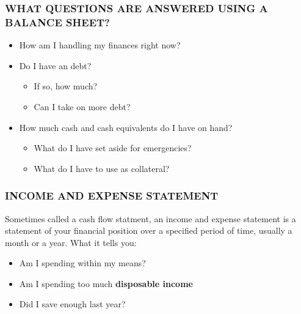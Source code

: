 \documentclass[12pt]{article}
\begin{document}
            \subsubsection{WHAT QUESTIONS ARE ANSWERED USING A BALANCE SHEET?}
                \begin{itemize}
                    \item How am I handling my finances right now?
                    \item Do I have an debt?
                        \begin{itemize}
                            \item If so, how much?
                            \item Can I take on more debt?
                        \end{itemize}
                    \item How much cash and cash equivalents do I have on hand?
                        \begin{itemize}
                            \item What do I have set aside for emergencies?
                            \item What do I have to use as collateral?
                        \end{itemize}
                \end{itemize}
            \subsubsection{INCOME AND EXPENSE STATEMENT}
                Sometimes called a cash flow statment, an income and expense statement is a statement of your financial
                position over a specified period of time, usually a month or a year.
                \newline What it tells you:
                    \begin{itemize}
                        \item Am I spending within my means?
                        \item Am I spending too much \textbf{disposable income}
                        \item Did I save enough last year?
                    \end{itemize}
\end{document}
